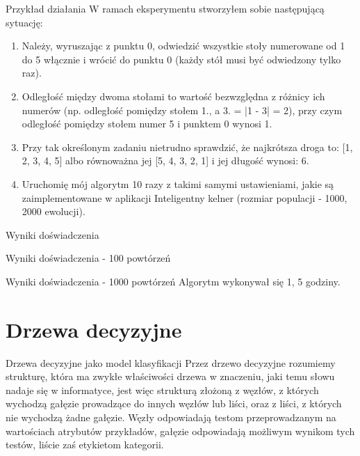 \documentclass[a4paper,10pt]{beamer}
\begin{document}
			\begin{frame}{Przykład działania}
				W ramach eksperymentu stworzyłem sobie następującą sytuację:
				\begin{enumerate}
					\item Należy, wyruszając z punktu 0, odwiedzić wszystkie stoły numerowane od 1 do 5 włącznie i wrócić do punktu 0 (każdy stół musi być odwiedzony tylko raz). 
					\item Odległość między dwoma stołami to wartość bezwzględna z różnicy ich numerów (np. odległość pomiędzy stołem 1., a 3. = |1 - 3| = 2), przy czym odległość pomiędzy stołem numer 5 i punktem 0 wynosi 1.
					\item Przy tak określonym zadaniu nietrudno sprawdzić, że najkrótsza droga to: [1, 2, 3, 4, 5] albo równoważna jej [5, 4, 3, 2, 1] i jej długość wynosi: 6.
					\item Uruchomię mój algorytm 10 razy z takimi samymi ustawieniami, jakie są zaimplementowane w aplikacji Inteligentny kelner (rozmiar populacji - 1000, 2000 ewolucji).
				\end{enumerate}
			\end{frame}
		\begin{frame}{Wyniki doświadczenia}
		\end{frame}
		\begin{frame}{Wyniki doświadczenia - 100 powtórzeń}
		\end{frame}
		\begin{frame}{Wyniki doświadczenia - 1000 powtórzeń}
			Algorytm wykonywał się 1, 5 godziny.
		\end{frame}

		

		\section{Drzewa decyzyjne}
		\begin{frame}{Drzewa decyzyjne jako model klasyfikacji}
			Przez drzewo decyzyjne rozumiemy strukturę, która ma zwykłe właściwości drzewa w znaczeniu, jaki temu słowu nadaje się w informatyce, jest więc strukturą złożoną z węzłów, z których wychodzą gałęzie prowadzące do innych węzłów lub liści, oraz z liści, z których nie wychodzą żadne gałęzie. Węzły 			odpowiadają testom przeprowadzanym na wartościach atrybutów przykładów, gałęzie odpowiadają możliwym wynikom tych testów, liście zaś etykietom kategorii.
		\end{frame}
\end{document}
